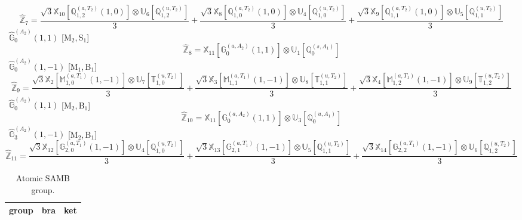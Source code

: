 \documentclass[fleqn,10pt,landscape]{article}
\begin{document}
\begin{itemize}
\begin{dmath*}
\hat{\mathbb{Z}}_{7}=\frac{\sqrt{3} \mathbb{X}_{10}[\mathbb{Q}_{1,2}^{(a,T_{2})}(1,0)] \otimes\mathbb{U}_{6}[\mathbb{Q}_{1,2}^{(u,T_{2})}]}{3} + \frac{\sqrt{3} \mathbb{X}_{8}[\mathbb{Q}_{1,0}^{(a,T_{2})}(1,0)] \otimes\mathbb{U}_{4}[\mathbb{Q}_{1,0}^{(u,T_{2})}]}{3} + \frac{\sqrt{3} \mathbb{X}_{9}[\mathbb{Q}_{1,1}^{(a,T_{2})}(1,0)] \otimes\mathbb{U}_{5}[\mathbb{Q}_{1,1}^{(u,T_{2})}]}{3}
\end{dmath*}
\vspace{4mm}
\noindent {} $\,\,\,\hat{\mathbb{G}}_{0}^{(A_{2})}(1,1)$ [M$_{2}$,\,S$_{1}$]
\begin{dmath*}
\hat{\mathbb{Z}}_{8}=\mathbb{X}_{11}[\mathbb{G}_{0}^{(a,A_{2})}(1,1)] \otimes\mathbb{U}_{1}[\mathbb{Q}_{0}^{(s,A_{1})}]
\end{dmath*}
\vspace{4mm}
\noindent {} $\,\,\,\hat{\mathbb{G}}_{0}^{(A_{2})}(1,-1)$ [M$_{1}$,\,B$_{1}$]
\begin{dmath*}
\hat{\mathbb{Z}}_{9}=\frac{\sqrt{3} \mathbb{X}_{2}[\mathbb{M}_{1,0}^{(a,T_{1})}(1,-1)] \otimes\mathbb{U}_{7}[\mathbb{T}_{1,0}^{(u,T_{2})}]}{3} + \frac{\sqrt{3} \mathbb{X}_{3}[\mathbb{M}_{1,1}^{(a,T_{1})}(1,-1)] \otimes\mathbb{U}_{8}[\mathbb{T}_{1,1}^{(u,T_{2})}]}{3} + \frac{\sqrt{3} \mathbb{X}_{4}[\mathbb{M}_{1,2}^{(a,T_{1})}(1,-1)] \otimes\mathbb{U}_{9}[\mathbb{T}_{1,2}^{(u,T_{2})}]}{3}
\end{dmath*}
\vspace{4mm}
\noindent {} $\,\,\,\hat{\mathbb{G}}_{0}^{(A_{2})}(1,1)$ [M$_{2}$,\,B$_{1}$]
\begin{dmath*}
\hat{\mathbb{Z}}_{10}=\mathbb{X}_{11}[\mathbb{G}_{0}^{(a,A_{2})}(1,1)] \otimes\mathbb{U}_{3}[\mathbb{Q}_{0}^{(u,A_{1})}]
\end{dmath*}
\vspace{4mm}
\noindent {} $\,\,\,\hat{\mathbb{G}}_{3}^{(A_{2})}(1,-1)$ [M$_{2}$,\,B$_{1}$]
\begin{dmath*}
\hat{\mathbb{Z}}_{11}=\frac{\sqrt{3} \mathbb{X}_{12}[\mathbb{G}_{2,0}^{(a,T_{1})}(1,-1)] \otimes\mathbb{U}_{4}[\mathbb{Q}_{1,0}^{(u,T_{2})}]}{3} + \frac{\sqrt{3} \mathbb{X}_{13}[\mathbb{G}_{2,1}^{(a,T_{1})}(1,-1)] \otimes\mathbb{U}_{5}[\mathbb{Q}_{1,1}^{(u,T_{2})}]}{3} + \frac{\sqrt{3} \mathbb{X}_{14}[\mathbb{G}_{2,2}^{(a,T_{1})}(1,-1)] \otimes\mathbb{U}_{6}[\mathbb{Q}_{1,2}^{(u,T_{2})}]}{3}
\end{dmath*}
\begin{center}
\renewcommand{\arraystretch}{1.3}
\begin{longtable}{c|c|c}
\caption{Atomic SAMB group.}
 \\
 \hline \hline
group & bra & ket \\ \hline \endfirsthead


\end{longtable}
\end{center}
\end{itemize}
\end{document}
